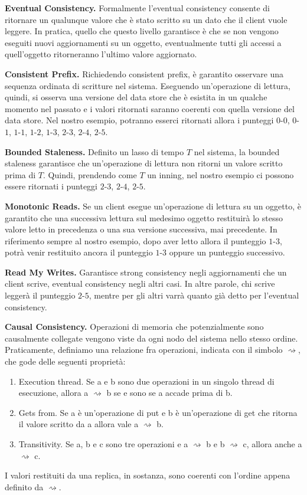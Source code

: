 \documentclass[twoside]{article}
\begin{document}
\begin{multicols}{2}
\textbf{Eventual Consistency.} Formalmente l'eventual consistency consente di ritornare un qualunque valore che è stato scritto su un dato che il client vuole leggere. In pratica, quello che questo livello garantisce è che se non vengono eseguiti nuovi aggiornamenti su un oggetto, eventualmente tutti gli accessi a quell'oggetto ritorneranno l'ultimo valore aggiornato.

\textbf{Consistent Prefix.} Richiedendo consistent prefix, è garantito osservare una sequenza ordinata di scritture nel sistema. Eseguendo un'operazione di lettura, quindi, si osserva una versione del data store che è esistita in un qualche momento nel passato e i valori ritornati saranno coerenti con quella versione del data store. Nel nostro esempio, potranno esserci ritornati allora i punteggi $0$-$0$, $0$-$1$, $1$-$1$, $1$-$2$, $1$-$3$, $2$-$3$, $2$-$4$, $2$-$5$.

\textbf{Bounded Staleness.} Definito un lasso di tempo $T$ nel sistema, la bounded staleness garantisce che un'operazione di lettura non ritorni un valore scritto prima di $T$. Quindi, prendendo come $T$ un inning, nel nostro esempio ci possono essere ritornati i punteggi $2$-$3$, $2$-$4$, $2$-$5$.

\textbf{Monotonic Reads.} Se un client esegue un'operazione di lettura su un oggetto, è garantito che una successiva lettura sul medesimo oggetto restituirà lo stesso valore letto in precedenza o una sua versione successiva, mai precedente. In riferimento sempre al nostro esempio, dopo aver letto allora il punteggio $1$-$3$, potrà venir restituito ancora il punteggio $1$-$3$ oppure un punteggio successivo.

\textbf{Read My Writes.}	Garantisce strong consistency negli aggiornamenti che un client scrive, eventual consistency negli altri casi. In altre parole, chi scrive leggerà il punteggio $2$-$5$, mentre per gli altri varrà quanto già detto per l'eventual consistency.

\textbf{Causal Consistency.} Operazioni di memoria che potenzialmente sono causalmente collegate vengono viste da ogni nodo del sistema nello stesso ordine. Praticamente, definiamo una relazione fra operazioni, indicata con il simbolo $\rightsquigarrow$, che gode delle seguenti proprietà:
\begin{enumerate}[topsep=0pt,itemsep=-1ex,partopsep=1ex,parsep=1ex]
\item Execution thread. Se a e b sono due operazioni in un singolo thread di esecuzione, allora a $\rightsquigarrow$ b se e sono se a accade prima di b.
\item Gets from. Se a è un'operazione di put e b è un'operazione di get che ritorna il valore scritto da a allora vale a $\rightsquigarrow$ b.
\item Transitivity. Se a, b e c sono tre operazioni e a $\rightsquigarrow$ b e b $\rightsquigarrow$ c, allora anche a $\rightsquigarrow$ c.
\end{enumerate}
I valori restituiti da una replica, in sostanza, sono coerenti con l'ordine appena definito da $\rightsquigarrow$.


\end{multicols}
\end{document}

